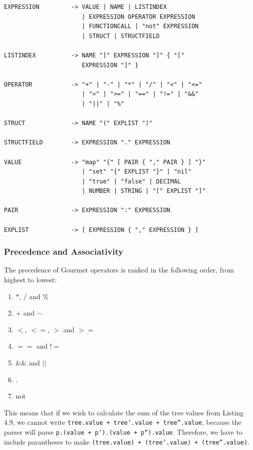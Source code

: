 \begin{lstlisting}[caption={Gourmet's grammar in EBNF notation.}, captionpos=b, label={The EBNF grammar of the Gourmet programming language.}]
EXPRESSION         -> VALUE | NAME | LISTINDEX
                      | EXPRESSION OPERATOR EXPRESSION
                      | FUNCTIONCALL | "not" EXPRESSION
                      | STRUCT | STRUCTFIELD

LISTINDEX          -> NAME "[" EXPRESSION "]" { "["
                      EXPRESSION "]" }

OPERATOR           -> "+" | "-" | "*" | "/" | "<" | "<="
                      | ">" | ">=" | "==" | "!=" | "&&"
                      | "||" | "%"

STRUCT             -> NAME "(" EXPLIST ")"

STRUCTFIELD        -> EXPRESSION "." EXPRESSION

VALUE              -> "map" "{" [ PAIR { "," PAIR } ] "}"
                      | "set" "{" EXPLIST "}" | "nil"
                      | "true" | "false" | DECIMAL
                      | NUMBER | STRING | "[" EXPLIST "]"

PAIR               -> EXPRESSION ":" EXPRESSION

EXPLIST            -> [ EXPRESSION { "," EXPRESSION } ]
\end{lstlisting}


\subsubsection{Precedence and Associativity}

The precedence of Gourmet operators is ranked in the following order, from highest to lowest:

\begin{enumerate}
    \item $*$, $/$ and $\%$
    \item $+$ and $-$
    \item $<$, $<=$, $>$ and $>=$
    \item $==$ and $!=$
    \item $\&\&$ and $||$
    \item $.$
    \item not
\end{enumerate}

This means that if we wish to calculate the sum of the tree values from Listing 4.9, we cannot write \texttt{tree.value + tree'.value + tree''.value}, because the parser will parse \texttt{p.(value + p').(value + p'').value}. Therefore, we have to include parantheses to make \texttt{(tree.value) + (tree'.value) + (tree''.value)}. \\

